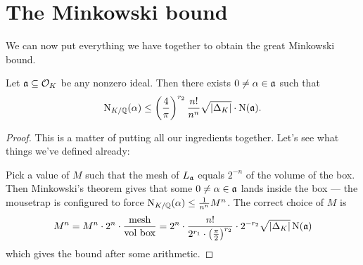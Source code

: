 \section{The Minkowski bound}
We can now put everything we have together to obtain the great Minkowski bound.
\begin{theorem}
	Let $\mathfrak a \subseteq \mathcal O_K$ be any nonzero ideal.
	Then there exists $0 \neq \alpha \in \mathfrak a$ such that
	\[ \operatorname{N}_{K/\mathbb Q}(\alpha) \le \left( \frac 4\pi \right)^{r_2} \frac{n!}{n^n} \sqrt{\left\lvert \Delta_K \right\rvert}
	\cdot \operatorname{N}(\mathfrak a). \]
\end{theorem}
\begin{proof}
	This is a matter of putting all our ingredients together.
	Let's see what things we've defined already:
	\begin{center}
	\end{center}
	Pick a value of $M$ such that the mesh of $L_\mathfrak a$
	equals $2^{-n}$ of the volume of the box.
	Then Minkowski's theorem gives that some $0 \neq \alpha \in \mathfrak a$ lands inside the box ---
	the mousetrap is configured to force $\operatorname{N}_{K/\mathbb Q}(\alpha) \le \frac{1}{n^n} M^n$.
	The correct choice of $M$ is
	\[
		M^n
		= M^n \cdot 2^n \cdot \frac{\text{mesh}}{\text{vol box}}
		= 2^n \cdot \frac{n!}{2^{r_1} \cdot \left( \frac \pi 2 \right)^{r_2}}
		\cdot 2^{-r_2} \sqrt{\left\lvert \Delta_K \right\rvert} \operatorname{N}(\mathfrak a)
	\]
	which gives the bound after some arithmetic.
\end{proof}

